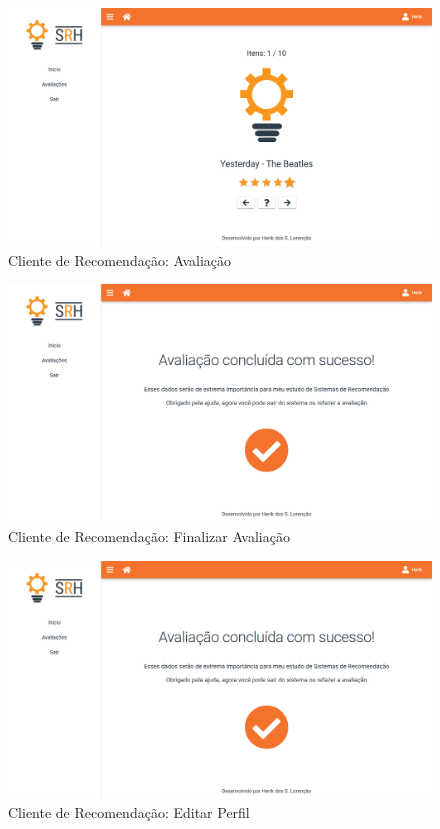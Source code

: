 \begin{figure}[H]
	\centering
	\includegraphics[width=.9\linewidth]{imagens/clientAvaliacao.png}
	\caption[Cliente de Recomendação: Avaliação]{Cliente de Recomendação: Avaliação}
    \label{fig:clienteAvaliacao}
\end{figure}

\begin{figure}[H]
	\centering
	\includegraphics[width=.9\linewidth]{imagens/clientFinalizar.png}
	\caption[Cliente de Recomendação: Finalizar Avaliação]{Cliente de Recomendação: Finalizar Avaliação}
    \label{fig:clienteAvaliacaoFinalizar}
\end{figure}

\begin{figure}[H]
	\centering
	\includegraphics[width=.9\linewidth]{imagens/clientFinalizar.png}
	\caption[Cliente de Recomendação: Editar Perfil]{Cliente de Recomendação: Editar Perfil}
    \label{fig:clienteEditarPerfil}
\end{figure}

